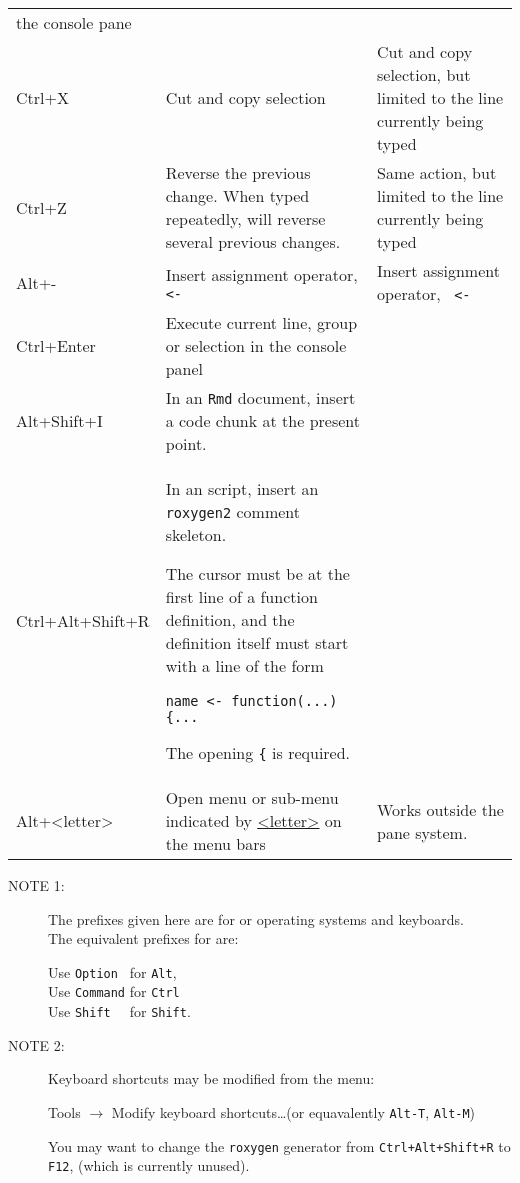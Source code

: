 \documentclass[11pt]{article}
\begin{document}
\begin{xltabular}{1.0\linewidth}[!htp]{@{}lXX@{}}
  the console pane& \\
  Ctrl+X & Cut and copy selection & Cut and copy selection, but
  limited to the  line currently being typed\\
  Ctrl+Z & Reverse the previous change.  When typed repeatedly, will
  reverse several previous changes. & Same action, but limited to the
  line currently being typed\\
  Alt+- & Insert assignment operator, \texttt{ <- } & Insert
  assignment operator, \texttt{ <- }\\
  Ctrl+Enter & Execute current line, group or selection in the console
  panel & \\
  Alt+Shift+I & In an \texttt{Rmd} document, insert a code chunk at
  the present  point. & \\
  Ctrl+Alt+Shift+R & In an \R script, insert an \texttt{roxygen2}
  comment skeleton.\par
  The cursor must be at the first line of a function definition, and
  the definition itself must start with a line of the form\par
  \texttt{name <- function(...) \{...}\par
  The opening \texttt{\{} is required.&\\
  \midrule Alt+<letter> & Open menu or sub-menu indicated by
  \underline{<letter>} on the menu bars& Works outside
  the pane system.\\
  \bottomrule
\end{xltabular}

\begin{small}
\begin{description}
\item[NOTE 1:] The prefixes given here are for \Windows or \Linux
  operating systems and keyboards.\\
  The equivalent prefixes for \MacOS are:

  Use \verb|Option | for \verb|Alt|,\\
  Use \verb|Command| for \verb|Ctrl|\\
  Use \verb|Shift  | for \verb|Shift|.
\item[NOTE 2:] Keyboard shortcuts may be modified from the menu:
  \begin{center}
    Tools $\longrightarrow$ Modify keyboard shortcuts\dots (or
    equavalently \verb|Alt-T|, \verb|Alt-M|)
  \end{center}
  You may want to change the \texttt{roxygen} generator from
  \verb|Ctrl+Alt+Shift+R| to \verb|F12|, (which is currently unused). 
\end{description}
\end{small}
\end{document}
